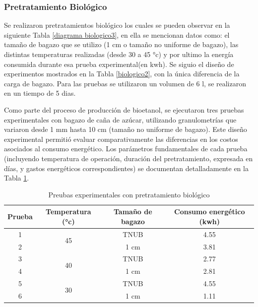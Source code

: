 \documentclass[12pt]{article}
\begin{document}
	
		
		
		\subsubsection{Pretratamiento Biológico}
		Se realizaron pretratamientos biológico los cuales se pueden observar en la siguiente Tabla \ref{diagrama biologico3}, en ella se mencionan datos como:  el tamaño de bagazo que se utilizo (1 cm o tamaño no uniforme de bagazo), las distintas temperaturas realizadas (desde 30 a 45 °c) y por ultimo la energía consumida durante esa prueba experimental(en kwh). Se siguio el diseño de experimentos mostrados en la Tabla \ref{biologico2}, con la única diferencia de la carga de bagazo. Para las pruebas se utilizaron un volumen de 6 l, se realizaron en un tiempo de 5 dias.
	
		Como parte del proceso de producción de bioetanol, se ejecutaron tres pruebas experimentales con bagazo de caña de azúcar, utilizando granulometrías que variaron desde 1 mm hasta 10 cm (tamaño no uniforme de bagazo). Este diseño experimental permitió evaluar comparativamente las diferencias en los costos asociados al consumo energético. Los parámetros fundamentales de cada prueba (incluyendo temperatura de operación, duración del pretratamiento, expresada en días, y gastos energéticos correspondientes) se documentan detalladamente en la Tabla \ref{Pretratamiento Biológico}.
		
	\begin{table}[H]
		\centering
		\caption{Preubas experimentales con pretratamiento biológico}
		\begin{tabular}{|c|c|c|c|}
			\hline
			Prueba & Temperatura (°c) & Tamaño de bagazo & Consumo energético (kwh) \\ \hline
			1 & \multirow{2}{*}{45} & TNUB & 4.55 \\ \cline{1-1} \cline{3-4}
			2 &  & 1 cm & 3.81 \\ \hline
			3 &\multirow{2}{*}{ 40} & TNUB & 2.77 \\ \cline{3-4} \cline{1-1}
			4 &  & 1 cm & 2.81 \\ \hline
			5 &\multirow{2}{*}{ 30} & TNUB & 4.55 \\ \cline{3-4}\cline{1-1}
			6 &  & 1 cm & 1.11 \\ \hline
		\end{tabular}
		\label{Pretratamiento Biológico}
	\end{table}
		
	
\end{document}
